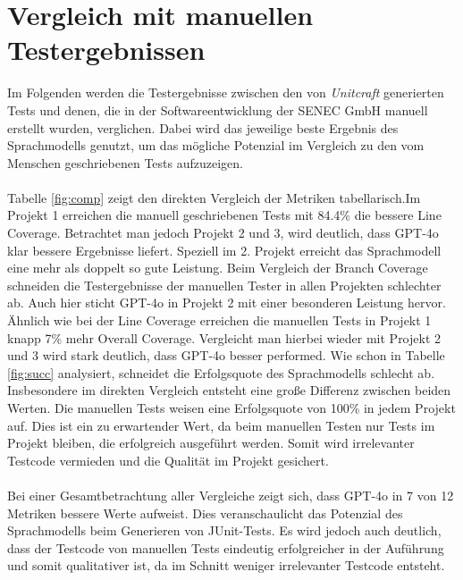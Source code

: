 \section{Vergleich mit manuellen Testergebnissen}
Im Folgenden werden die Testergebnisse zwischen den von \textit{Unitcraft} generierten Tests und denen, die in der Softwareentwicklung der SENEC GmbH manuell erstellt wurden, verglichen. Dabei wird das jeweilige beste Ergebnis des Sprachmodells genutzt, um das mögliche Potenzial im Vergleich zu den vom Menschen geschriebenen Tests aufzuzeigen.\\\\
Tabelle \ref{fig:comp} zeigt den direkten Vergleich der Metriken tabellarisch.Im Projekt 1 erreichen die manuell geschriebenen Tests mit 84.4\% die bessere Line Coverage. Betrachtet man jedoch Projekt 2 und 3, wird deutlich, dass GPT-4o klar bessere Ergebnisse liefert. Speziell im 2. Projekt erreicht das Sprachmodell eine mehr als doppelt so gute Leistung. Beim Vergleich der Branch Coverage schneiden die Testergebnisse der manuellen Tester in allen Projekten schlechter ab. Auch hier sticht GPT-4o in Projekt 2 mit einer besonderen Leistung hervor. Ähnlich wie bei der Line Coverage erreichen die manuellen Tests in Projekt 1 knapp 7\% mehr Overall Coverage. Vergleicht man hierbei wieder mit Projekt 2 und 3 wird stark deutlich, dass GPT-4o besser performed. Wie schon in Tabelle \ref{fig:succ} analysiert, schneidet die Erfolgsquote des Sprachmodells schlecht ab. Insbesondere im direkten Vergleich entsteht eine große Differenz zwischen beiden Werten. Die manuellen Tests weisen eine Erfolgsquote von 100\% in jedem Projekt auf. Dies ist ein zu erwartender Wert, da beim manuellen Testen nur Tests im Projekt bleiben, die erfolgreich ausgeführt werden. Somit wird irrelevanter Testcode vermieden und die Qualität im Projekt gesichert.\\\\
Bei einer Gesamtbetrachtung aller Vergleiche zeigt sich, dass GPT-4o in 7 von 12 Metriken bessere Werte aufweist. Dies veranschaulicht das Potenzial des Sprachmodells beim Generieren von JUnit-Tests. Es wird jedoch auch deutlich, dass der Testcode von manuellen Tests eindeutig erfolgreicher in der Auführung und somit qualitativer ist, da im Schnitt weniger irrelevanter Testcode entsteht.
